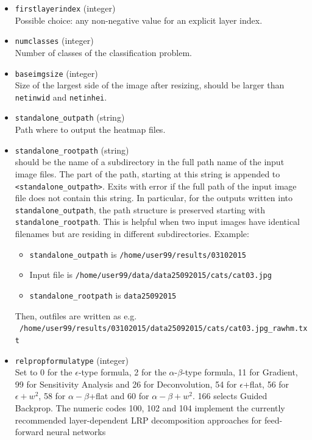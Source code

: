 \documentclass[a4wide]{article}
\begin{document}
\begin{itemize}
 \item \texttt{firstlayerindex} (integer) \\
Possible choice: any non-negative value for an explicit layer index.

\item \texttt{numclasses} (integer) \\
Number of classes of the classification problem.

\item \texttt{baseimgsize} (integer)  \\
Size of the largest side of the image after resizing, should be larger than \texttt{netinwid} and \texttt{netinhei}.

\item \texttt{standalone\_outpath} (string) \\
Path where to output the heatmap files.

\item \texttt{standalone\_rootpath}  (string) \\
should be the name of a subdirectory in the full path name of the input image files. The part of the path, starting at this string is appended to \texttt{<standalone\_outpath>}. Exits with error if the full path of the input image file does not contain this string. In particular, for the outputs written into \texttt{standalone\_outpath}, the path structure is preserved starting with \texttt{standalone\_rootpath}. This is helpful when two input images have identical filenames but are residing in different subdirectories. Example:
\begin{itemize}
\item \texttt{standalone\_outpath} is \texttt{/home/user99/results/03102015}
\item Input file is \texttt{/home/user99/data/data25092015/cats/cat03.jpg}
\item \texttt{standalone\_rootpath} is \texttt{data25092015}
\end{itemize}
Then, outfiles are written as e.g. \texttt{~/home/user99/results/03102015/data25092015/cats/cat03.jpg\_rawhm.txt}


\item \texttt{relpropformulatype} (integer) \\
Set to 0 for the $\epsilon$-type formula,
2 for the $\alpha$-$\beta$-type formula,
11 for Gradient,
99 for Sensitivity Analysis and 26 for Deconvolution,
54 for $\epsilon$+flat,
56  for $\epsilon+w^2$,
58 for $\alpha-\beta$+flat
and 60 for $\alpha-\beta+w^2$.
166 selects Guided Backprop.
The numeric codes 100, 102 and 104 implement the currently recommended layer-dependent LRP decomposition approaches for feed-forward neural networks~\cite{kohlbrenner2019towards,samek2020toward}


\end{itemize}
\end{document}
